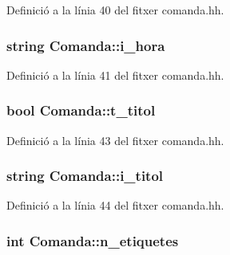 Definició a la línia 40 del fitxer comanda.\-hh.

\hypertarget{class_comanda_a480a34460b3668a5b4a1fa7e796632db}{
\subsubsection[{i\-\_\-hora}]{\setlength{\rightskip}{0pt plus 5cm}string Comanda\-::i\-\_\-hora\hspace{0.3cm}{\ttfamily [private]}}}\label{class_comanda_a480a34460b3668a5b4a1fa7e796632db}


Definició a la línia 41 del fitxer comanda.\-hh.

\hypertarget{class_comanda_a08e8674396e2125cf8b2900f289713a7}{
\subsubsection[{t\-\_\-titol}]{\setlength{\rightskip}{0pt plus 5cm}bool Comanda\-::t\-\_\-titol\hspace{0.3cm}{\ttfamily [private]}}}\label{class_comanda_a08e8674396e2125cf8b2900f289713a7}


Definició a la línia 43 del fitxer comanda.\-hh.

\hypertarget{class_comanda_aca04e90eab5ac14ddc3b25f154aabe48}{
\subsubsection[{i\-\_\-titol}]{\setlength{\rightskip}{0pt plus 5cm}string Comanda\-::i\-\_\-titol\hspace{0.3cm}{\ttfamily [private]}}}\label{class_comanda_aca04e90eab5ac14ddc3b25f154aabe48}


Definició a la línia 44 del fitxer comanda.\-hh.

\hypertarget{class_comanda_a1e525815f0745140e05da2ebb96ec39a}{
\subsubsection[{n\-\_\-etiquetes}]{\setlength{\rightskip}{0pt plus 5cm}int Comanda\-::n\-\_\-etiquetes\hspace{0.3cm}{\ttfamily [private]}}}\label{class_comanda_a1e525815f0745140e05da2ebb96ec39a}


